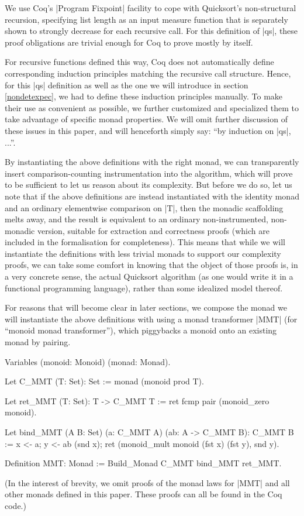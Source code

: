 \documentclass[runningheads]{llncs}
\begin{document}
We use Coq's |Program Fixpoint| facility \cite{subsetcoercions} to cope with Quicksort's non-structural recursion, specifying list length as an input measure function that is separately shown to strongly decrease for each recursive call. For this definition of |qs|, these proof obligations are trivial enough for Coq to prove mostly by itself.

For recursive functions defined this way, Coq does not automatically define corresponding induction principles matching the recursive call structure. Hence, for this |qs| definition as well as the one we will introduce in section \ref{nondetexpec}, we had to define these induction principles manually. To make their use as convenient as possible, we further customized and specialized them to take advantage of specific monad properties. We will omit further discussion of these issues in this paper, and will henceforth simply say: ``by induction on |qs|, ...''.

By instantiating the above definitions with the right monad, we can transparently insert comparison-counting instrumentation into the algorithm, which will prove to be sufficient to let us reason about its complexity. But before we do so, let us note that if the above definitions are instead instantiated with the identity monad and an ordinary elementwise comparison on |T|, then the monadic scaffolding melts away, and the result is equivalent to an ordinary non-instrumented, non-monadic version, suitable for extraction and correctness proofs (which are included in the formalisation for completeness). This means that while we will instantiate the definitions with less trivial monads to support our complexity proofs, we can take some comfort in knowing that the object of those proofs is, in a very concrete sense, the actual Quicksort algorithm (as one would write it in a functional programming language), rather than some idealized model thereof.

For reasons that will become clear in later sections, we compose the monad we will instantiate the above definitions with using a monad transformer \cite{monadtrans} |MMT| (for ``monoid monad transformer''), which piggybacks a monoid onto an existing monad by pairing.

\begin{code}
  Variables (monoid: Monoid) (monad: Monad).

  Let C_MMT (T: Set): Set := monad (monoid prod T).

  Let ret_MMT (T: Set): T -> C_MMT T := ret fcmp pair (monoid_zero monoid).

  Let bind_MMT (A B: Set) (a: C_MMT A) (ab: A -> C_MMT B): C_MMT B :=
    x <- a; y <- ab (snd x); ret (monoid_mult monoid (fst x) (fst y), snd y).

  Definition MMT: Monad := Build_Monad C_MMT bind_MMT ret_MMT.
\end{code}
(In the interest of brevity, we omit proofs of the monad laws for |MMT| and all other monads defined in this paper. These proofs can all be found in the Coq code.)
\end{document}
